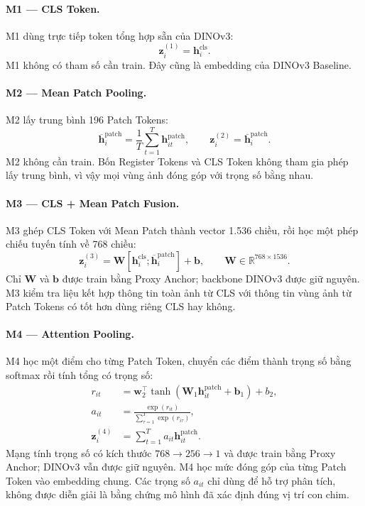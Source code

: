 \documentclass[11pt,a4paper]{article}
\begin{document}
\paragraph{M1 --- CLS Token.}
M1 dùng trực tiếp token tổng hợp sẵn của DINOv3:
\begin{equation}
 \mathbf z_i^{(1)}=\mathbf h_i^{\mathrm{cls}}.
\end{equation}
M1 không có tham số cần train. Đây cũng là embedding của DINOv3 Baseline.

\paragraph{M2 --- Mean Patch Pooling.}
M2 lấy trung bình 196 Patch Tokens:
\begin{equation}
 \overline{\mathbf h}_i^{\mathrm{patch}}
 =\frac{1}{T}\sum_{t=1}^{T}\mathbf h_{it}^{\mathrm{patch}},
 \qquad \mathbf z_i^{(2)}=\overline{\mathbf h}_i^{\mathrm{patch}}.
\end{equation}
M2 không cần train. Bốn Register Tokens và CLS Token không tham gia phép lấy
trung bình, vì vậy mọi vùng ảnh đóng góp với trọng số bằng nhau.

\paragraph{M3 --- CLS + Mean Patch Fusion.}
M3 ghép CLS Token với Mean Patch thành vector 1.536 chiều, rồi học một phép
chiếu tuyến tính về 768 chiều:
\begin{equation}
 \mathbf z_i^{(3)}
 =\mathbf W[\mathbf h_i^{\mathrm{cls}};
 \overline{\mathbf h}_i^{\mathrm{patch}}]+\mathbf b,
 \qquad \mathbf W\in\mathbb{R}^{768\times1536}.
\end{equation}
Chỉ $\mathbf W$ và $\mathbf b$ được train bằng Proxy Anchor; backbone DINOv3 được giữ nguyên.
M3 kiểm tra liệu kết hợp thông tin toàn ảnh từ CLS với thông tin vùng ảnh từ
Patch Tokens có tốt hơn dùng riêng CLS hay không.

\paragraph{M4 --- Attention Pooling.}
M4 học một điểm cho từng Patch Token, chuyển các điểm thành trọng số bằng
softmax rồi tính tổng có trọng số:
\begin{align}
 r_{it}&=\mathbf w_2^\top\tanh(
 \mathbf W_1\mathbf h_{it}^{\mathrm{patch}}+\mathbf b_1)+b_2,\\
 a_{it}&=\frac{\exp(r_{it})}{\sum_{\tau=1}^{T}\exp(r_{i\tau})},\\
 \mathbf z_i^{(4)}&=\sum_{t=1}^{T}a_{it}\mathbf h_{it}^{\mathrm{patch}}.
\end{align}
Mạng tính trọng số có kích thước $768\rightarrow256\rightarrow1$ và được
train bằng Proxy Anchor; DINOv3 vẫn được giữ nguyên. M4 học mức đóng góp của
từng Patch Token vào embedding chung. Các trọng số $a_{it}$ chỉ dùng để hỗ trợ
phân tích, không được diễn giải là bằng chứng mô hình đã xác định đúng vị trí
con chim.
\end{document}
